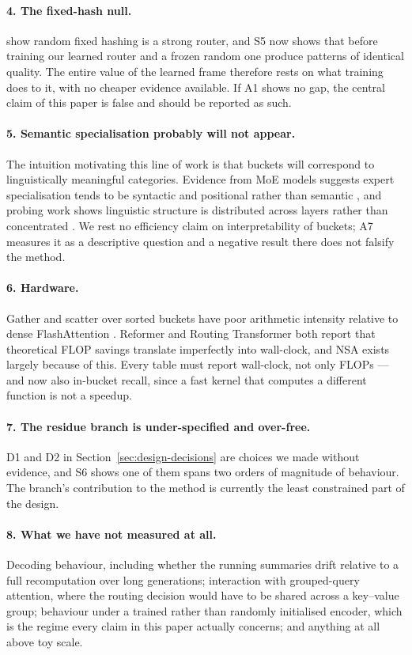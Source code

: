 \paragraph{4. The fixed-hash null.} \citet{roller2021hash} show random fixed hashing is a strong router, and S5 now shows that before training our learned router and a frozen random one produce patterns of identical quality. The entire value of the learned frame therefore rests on what training does to it, with no cheaper evidence available. If A1 shows no gap, the central claim of this paper is false and should be reported as such.

\paragraph{5. Semantic specialisation probably will not appear.} The intuition motivating this line of work is that buckets will correspond to linguistically meaningful categories. Evidence from MoE models suggests expert specialisation tends to be syntactic and positional rather than semantic \citep{jiang2024mixtral}, and probing work shows linguistic structure is distributed across layers rather than concentrated \citep{tenney2019bert,clark2019bertlook}. We rest no efficiency claim on interpretability of buckets; A7 measures it as a descriptive question and a negative result there does not falsify the method.

\paragraph{6. Hardware.} Gather and scatter over sorted buckets have poor arithmetic intensity relative to dense FlashAttention \citep{dao2022flashattention}. Reformer and Routing Transformer both report that theoretical FLOP savings translate imperfectly into wall-clock, and NSA \citep{yuan2025nsa} exists largely because of this. Every table must report wall-clock, not only FLOPs --- and now also in-bucket recall, since a fast kernel that computes a different function is not a speedup.

\paragraph{7. The residue branch is under-specified and over-free.} D1 and D2 in Section~\ref{sec:design-decisions} are choices we made without evidence, and S6 shows one of them spans two orders of magnitude of behaviour. The branch's contribution to the method is currently the least constrained part of the design.

\paragraph{8. What we have not measured at all.} Decoding behaviour, including whether the running summaries drift relative to a full recomputation over long generations; interaction with grouped-query attention, where the routing decision would have to be shared across a key--value group; behaviour under a trained rather than randomly initialised encoder, which is the regime every claim in this paper actually concerns; and anything at all above toy scale.
